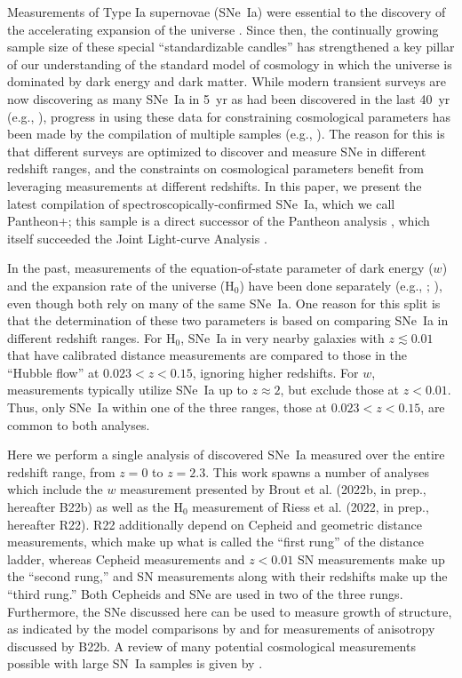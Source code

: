 \documentclass[twocolumn]{aastex63}
\begin{document}
Measurements of Type Ia supernovae (SNe~Ia) were essential to the discovery of the accelerating expansion of the universe \citep{Riess1998,Perlmutter1999}. Since then, the continually growing sample size of these special ``standardizable candles'' has strengthened a key pillar of our understanding of the standard model of cosmology in which the universe is dominated by dark energy and dark matter.  While modern transient surveys are now discovering as many SNe~Ia in 5~yr as had been discovered in the last 40~yr (e.g., \citealp{Smith2020,dhawan21,jones21}), progress in using these data for constraining cosmological parameters has been made by the compilation of multiple samples (e.g., \citealp{Betoule2014,Scolnic2018,Brout2019,Jones19}).  The reason for this is that different surveys are optimized to discover and measure SNe in different redshift ranges, and the constraints on cosmological parameters benefit from leveraging measurements at different redshifts.  In this paper, we present the latest compilation of spectroscopically-confirmed SNe~Ia, which we call Pantheon+; this sample is a direct successor of the Pantheon analysis \citep{Scolnic2018}, which itself succeeded the Joint Light-curve Analysis \citep[JLA;][]{Betoule2014}.

In the past, measurements of the equation-of-state parameter of dark energy ($w$) and the expansion rate of the universe (H$_0$) have been done separately (e.g., \citealp{Riess2016}; \citealp{Scolnic2018}), even though both rely on many of the same SNe~Ia.  One reason for this split is that the determination of these two parameters is based on comparing SNe~Ia  in different redshift ranges.  For H$_0$, SNe~Ia in very nearby galaxies with $z \lesssim 0.01$ that have calibrated distance measurements are compared to those in the ``Hubble flow'' at $0.023<z<0.15$, ignoring higher redshifts.  For $w$, measurements typically  utilize SNe~Ia up to $z\approx2$, but exclude those at $z<0.01$. Thus, only SNe~Ia within one of the three ranges, those at $0.023 < z < 0.15$, are common to both analyses.  


Here we perform a single analysis of discovered SNe~Ia measured over the entire redshift range, from $z=0$ to $z=2.3$.  This work spawns a number of analyses which include the $w$ measurement presented by Brout et al. (2022b, in prep., hereafter B22b) as well as the H$_0$ measurement of Riess et al. (2022, in prep., hereafter R22).  R22 additionally depend on Cepheid and geometric distance measurements, which make up what is called the ``first rung'' of the distance ladder, whereas Cepheid measurements and $z<0.01$ SN measurements make up the ``second rung,'' and SN measurements along with their redshifts make up the ``third rung.''  Both Cepheids and SNe are used in two of the three rungs.  Furthermore, the SNe discussed here can be used to measure growth of structure, as indicated by the model comparisons by \cite{Peterson2021} and for measurements of anisotropy discussed by B22b.  A review of many potential cosmological measurements possible with large SN~Ia samples is given by \cite{Scolnic_Decadal}.
\end{document}
